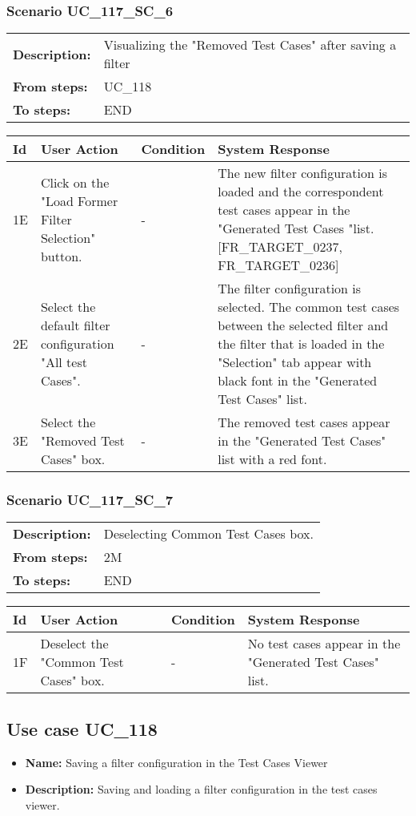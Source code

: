 \documentclass[a4paper,11pt]{article}
\newcommand{\bl}{\\ \hline}
\begin{document}
\subsubsection*{Scenario UC_117_SC_6}
\begin{tabular}{p{1in}p{4in}}
{\bf Description:} & Visualizing the "Removed Test Cases" after saving a filter \\
{\bf From steps:} & UC_118#1A \\
{\bf To steps:} & END \\
\end{tabular}
 
\begin{tabular}{|p{0.8in}|p{1.6in}|p{1.6in}|p{1.6in}|}
\hline
Id & User Action & Condition & System Response  \bl 
1E & Click on the "Load Former Filter Selection" button. & - & The new filter configuration is loaded and the correspondent test cases appear in the "Generated Test Cases "list. [FR_TARGET_0237, FR_TARGET_0236] \bl 
2E & Select the default filter configuration "All test Cases". & - & The filter configuration is selected. The common test cases between the selected filter and the filter that is loaded in the "Selection" tab appear with black font in the "Generated Test Cases" list. \bl 
3E & Select the "Removed Test Cases" box. & - & The removed test cases appear in the "Generated Test Cases" list with a red font. \bl 
\end{tabular}
\subsubsection*{Scenario UC_117_SC_7}
\begin{tabular}{p{1in}p{4in}}
{\bf Description:} & Deselecting Common Test Cases box. \\
{\bf From steps:} & 2M \\
{\bf To steps:} & END \\
\end{tabular}
 
\begin{tabular}{|p{0.8in}|p{1.6in}|p{1.6in}|p{1.6in}|}
\hline
Id & User Action & Condition & System Response  \bl 
1F & Deselect the "Common Test Cases" box. & - & No test cases appear in the "Generated Test Cases" list. \bl 
\end{tabular}
\subsection*{Use case UC_118}
\begin{itemize}
\item {\bf Name: }Saving a filter configuration in the Test Cases Viewer
\item {\bf Description: }Saving and loading a filter configuration in the test cases viewer.
\end{itemize}
\end{document}
